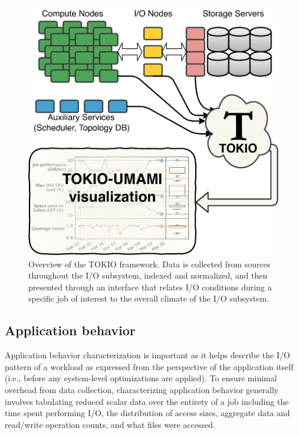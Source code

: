 \begin{figure}[t]
    \centering
    \includegraphics[width=\columnwidth]{figs/tokio-schematic.pdf}
    \caption{Overview of the TOKIO framework.  Data is collected from sources throughout the I/O subsystem, indexed and normalized, and then presented through an interface that relates I/O conditions during a specific job of interest to the overall climate of the I/O subsystem.}
    \label{fig:tokio-schematic}
\vspace{-.2in}
\end{figure}

\subsection{Application behavior} \label{sec:methods/darshan}

Application behavior characterization is important as it helps describe the I/O pattern of a workload as expressed from the perspective of the application itself (i.e., before any system-level optimizations are applied).
To ensure minimal overhead from data collection, characterizing application behavior generally involves tabulating reduced scalar data over the entirety of a job including the time spent performing I/O, the distribution of access sizes, aggregate data and read/write operation counts, and what files were accessed.


